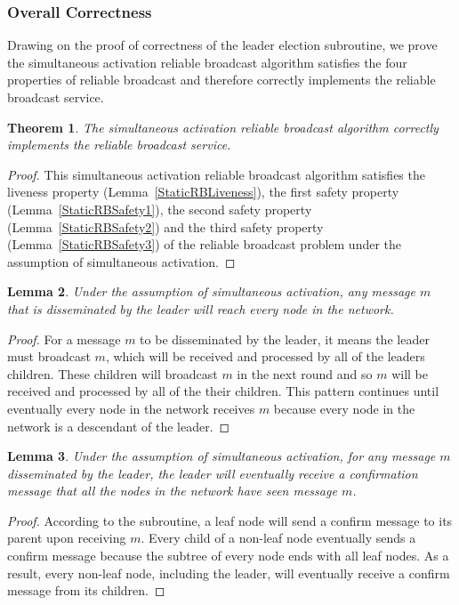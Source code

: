 \documentclass[english]{article}
\newtheorem{theorem}{Theorem}[section]
\newtheorem{lemma}[theorem]{Lemma}
\begin{document}
\subsubsection {Overall Correctness}

Drawing on the proof of correctness of the leader election subroutine, we prove the simultaneous activation reliable broadcast algorithm satisfies the four properties of reliable broadcast and therefore correctly implements the reliable broadcast service.

\begin{theorem}
\label{StaticReliableBroadcast}
The simultaneous activation reliable broadcast algorithm correctly implements the reliable broadcast service.
\end{theorem}
\begin{proof}
This simultaneous activation reliable broadcast algorithm satisfies the liveness property (Lemma~\ref{StaticRBLiveness}), 
the first safety property (Lemma~\ref{StaticRBSafety1}),
the second safety property (Lemma~\ref{StaticRBSafety2}) and 
the third safety property (Lemma~\ref{StaticRBSafety3}) of the reliable broadcast problem under the assumption of simultaneous activation.
\end{proof}

\begin{lemma}
\label{StaticMessageDissemination}
Under the assumption of simultaneous activation, any message $m$ that is disseminated by the leader will reach every node in the network.
\end{lemma}
\begin{proof}

For a message $m$ to be disseminated by the leader, it means the leader must broadcast $m$, which will be received and processed by all of the leaders children. These children will broadcast $m$ in the next round and so $m$ will be received and processed by all of the their children. This pattern continues until eventually every node in the network receives $m$ because every node in the network is a descendant of the leader. 

\end{proof}


\begin{lemma}
\label{StaticConfirmationMessage}
Under the assumption of simultaneous activation, for any message $m$ disseminated by the leader, the leader will eventually receive a confirmation message that all the nodes in the network have seen message $m$.
\end{lemma}
\begin{proof}

According to the subroutine, a leaf node will send a confirm message to its parent upon receiving $m$. Every child of a non-leaf node eventually sends a confirm message because the subtree of every node ends with all leaf nodes. As a result, every non-leaf node, including the leader, will eventually receive a confirm message from its children.

\end{proof}
\end{document}
